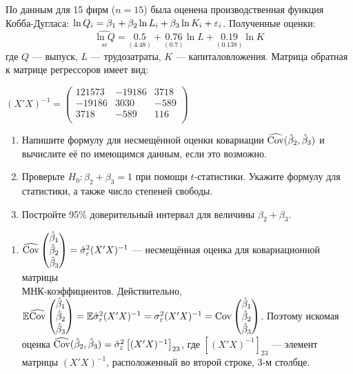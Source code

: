\begin{problem}
По данным для 15 фирм ($n = 15$) была оценена производственная функция Кобба-Дугласа: $\ln Q_i = \beta_1 + \beta_2 \ln L_i + \beta_3 \ln K_i + \varepsilon_i$. Полученные оценки:
\[\underset{se}{\widehat{\ln Q}} = \underset{(4.48)}{0.5} + \underset{(0.7)}{0.76} \ln L + \underset{(0.138)}{0.19} \ln K\]
где $Q$ — выпуск, $L$ — трудозатраты, $K$ — капиталовложения. Матрица обратная к матрице регрессоров имеет вид:

$(X' X)^{-1} = \begin{pmatrix}
121573 & -19186 & 3718 \\
-19186 & 3030 & -589 \\
3718 & -589 & 116 \\
\end{pmatrix}$

\begin{enumerate}
\item Напишите формулу для несмещённой оценки ковариации $\widehat{\operatorname{Cov}}(\hat{\beta}_2, \hat{\beta}_3)$ и вычислите её по имеющимся данным, если это возможно.
\item Проверьте $H_0: \beta_2 + \beta_3 = 1$ при помощи $t$-статистики. Укажите формулу для статистики, а также число степеней свободы.
\item Постройте 95\% доверительный интервал для величины $\beta_2 + \beta_3$.
\end{enumerate}


\begin{sol}
\begin{enumerate}
\item $\widehat{\operatorname{Cov}}\begin{pmatrix}
\hat{\beta}_1 \\
\hat{\beta}_2 \\
\hat{\beta}_3 \\
\end{pmatrix} = \hat{\sigma}_{\varepsilon}^2 (X'X)^{-1}$ — несмещённая оценка для ковариационной матрицы \\ МНК-коэффициентов. Действительно, $\mathbb{E}\widehat{\operatorname{Cov}}\begin{pmatrix}
\hat{\beta}_1 \\
\hat{\beta}_2 \\
\hat{\beta}_3 \\
\end{pmatrix} = \mathbb{E}\hat{\sigma}_{\varepsilon}^2 (X'X)^{-1} = \sigma_{\varepsilon}^2 (X'X)^{-1} = \operatorname{Cov}\begin{pmatrix}
\hat{\beta}_1 \\
\hat{\beta}_2 \\
\hat{\beta}_3 \\
\end{pmatrix}$. Поэтому искомая оценка $\widehat{\operatorname{Cov}}(\hat{\beta}_2, \hat{\beta}_3) = \hat{\sigma}_{\varepsilon}^2 \left[ (X' X)^{-1} \right]_{23}$, где $\left[ (X' X)^{-1} \right]_{23}$ — элемент матрицы $(X' X)^{-1}$, расположенный во второй строке, 3-м столбце.


\end{enumerate}
\end{sol}
\end{problem}
